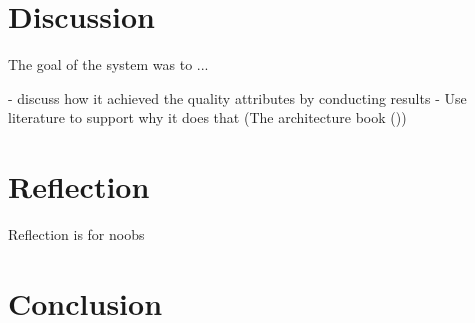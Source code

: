 \documentclass[conference]{IEEEtran}
\begin{document}
\section{Discussion}
The goal of the system was to ...

- discuss how it achieved the quality attributes by conducting results - Use literature to support why it does that (The architecture book (\cite{Bass2012Software}))


\section{Reflection}

Reflection is for noobs


\section{Conclusion}




\vspace{12pt}
\end{document}
